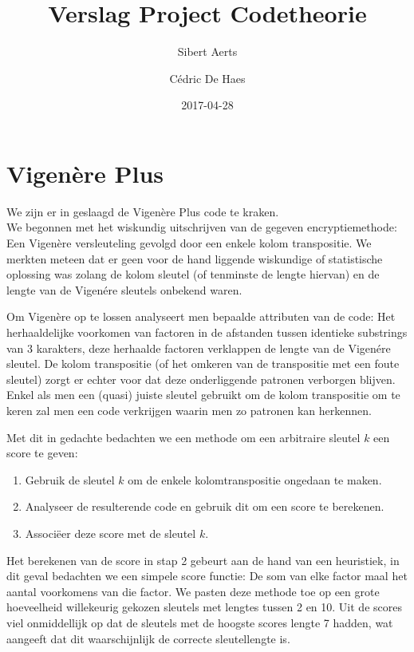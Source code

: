 \documentclass[fleqn]{article}
\title{Verslag Project Codetheorie}
\date{2017-04-28}
\author{Sibert Aerts \and C\'{e}dric De Haes}
\begin{document}
	\maketitle
	
	\section{Vigen\`ere Plus}
	We zijn er in geslaagd de Vigen\`ere Plus code te kraken.\\
	We begonnen met het wiskundig uitschrijven van de gegeven encryptiemethode: Een Vigen\`ere versleuteling gevolgd door een enkele kolom transpositie. We merkten meteen dat er geen voor de hand liggende wiskundige of statistische oplossing was zolang de kolom sleutel (of tenminste de lengte hiervan) en de lengte van de Vigen\'ere sleutels onbekend waren.
	
	Om Vigen\`ere op te lossen analyseert men bepaalde attributen van de code: Het herhaaldelijke voorkomen van factoren in de afstanden tussen identieke substrings van 3 karakters, deze herhaalde factoren verklappen de lengte van de  Vigen\'ere sleutel. De kolom transpositie (of het omkeren van de transpositie met een foute sleutel) zorgt er echter voor dat deze onderliggende patronen verborgen blijven. Enkel als men een (quasi) juiste sleutel gebruikt om de kolom transpositie om te keren zal men een code verkrijgen waarin men zo patronen kan herkennen.
	
	Met dit in gedachte bedachten we een methode om een arbitraire sleutel $k$ een score te geven:
	\begin{enumerate}
		\setlength\itemsep{0pt}
		\item Gebruik de sleutel $k$ om de enkele kolomtranspositie ongedaan te maken.
		\item Analyseer de resulterende code en gebruik dit om een score te berekenen.
		\item Associ\"eer deze score met de sleutel $k$.
	\end{enumerate}
	Het berekenen van de score in stap 2 gebeurt aan de hand van een heuristiek, in dit geval bedachten we een simpele score functie: De som van elke factor maal het aantal voorkomens van die factor. We pasten deze methode toe op een grote hoeveelheid willekeurig gekozen sleutels met lengtes tussen 2 en 10. Uit de scores viel onmiddellijk op dat de sleutels met de hoogste scores lengte 7 hadden, wat aangeeft dat dit waarschijnlijk de correcte sleutellengte is.
	
\end{document}
